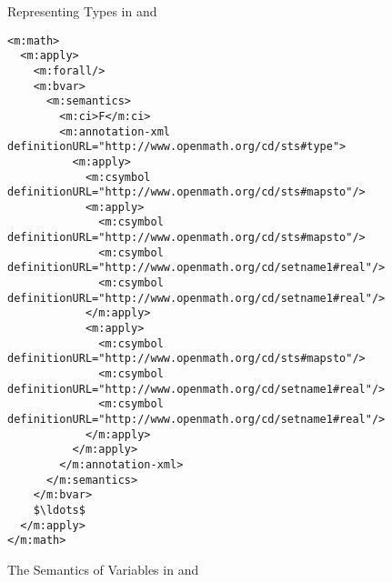 \begin{omgroup}[id=mobj,short=Mathematical Objects]
\begin{module}[id=omml-types]
\begin{omgroup}[id=mobj.types]{Representing Types in {\cmathml} and {\openmath}}
 \begin{lstlisting}[language=MathML,label=lst:complex-type-mathml,mathescape,
     caption={A Complex Type in {\cmathml}},
     index={math,apply,forall,bvar,ci,csymbol}]
<m:math>
  <m:apply>  
    <m:forall/>
    <m:bvar>
      <m:semantics>
        <m:ci>F</m:ci>
        <m:annotation-xml definitionURL="http://www.openmath.org/cd/sts#type">
          <m:apply>
            <m:csymbol definitionURL="http://www.openmath.org/cd/sts#mapsto"/>
            <m:apply>
              <m:csymbol definitionURL="http://www.openmath.org/cd/sts#mapsto"/>
              <m:csymbol definitionURL="http://www.openmath.org/cd/setname1#real"/>
              <m:csymbol definitionURL="http://www.openmath.org/cd/setname1#real"/>
            </m:apply>        
            <m:apply>
              <m:csymbol definitionURL="http://www.openmath.org/cd/sts#mapsto"/>
              <m:csymbol definitionURL="http://www.openmath.org/cd/setname1#real"/>
              <m:csymbol definitionURL="http://www.openmath.org/cd/setname1#real"/>
            </m:apply>        
          </m:apply>
        </m:annotation-xml>
      </m:semantics>
    </m:bvar>
    $\ldots$
  </m:apply>
</m:math>
 \end{lstlisting}
\end{omgroup}
\end{module}

\begin{module}[id=omml-semvar]
\begin{omgroup}[id=sem-var,short=Semantics of Variables]{The Semantics of Variables in
  {\openmath} and {\cmathml}}
 

\end{omgroup}
\end{module}
\end{omgroup}
